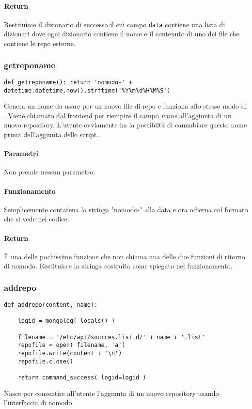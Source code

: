 \documentclass[11pt]{article}
\begin{document}
\paragraph{Return}
Restituisce il dizionario di successo il cui campo \texttt{data} contiene una lista di dizionari dove ogni dizionario contiene
il nome e il contenuto di uno dei file che contiene le repo esterne.

\subsubsection{getreponame}\label{getreponame}
\begin{lstlisting}
def getreponame(): return 'nomodo-' + datetime.datetime.now().strftime('%Y%m%d%H%M%S')
\end{lstlisting}
Genera un nome da usare per un nuovo file di repo e funziona allo stesso modo di .
Viene chiamato dal frontend per riempire il campo \textit{name} all'aggiunta di un nuovo repository.
L'utente ovviamente ha la possibiltà di cammbiare questo nome prima dell'aggiunta dello script.
\paragraph{Parametri}
Non prende nessun parametro.
\paragraph{Funzionamento}
Semplicemente contatena la stringa "nomodo-" alla data e ora odierna col formato che si vede nel codice.
\paragraph{Return}
È una delle pochissime funzione che non chiama una delle due funzioni di ritorno di nomodo.
Restituisce la stringa costruita come spiegato nel funzionamento.

\subsubsection{addrepo}\label{addrepo}
\begin{lstlisting}
def addrepo(content, name):

    logid = mongolog( locals() )

    filename = '/etc/apt/sources.list.d/' + name + '.list'
    repofile = open( filename, 'a')
    repofile.write(content + '\n')
    repofile.close()

    return command_success( logid=logid )
\end{lstlisting}
Nasce per consentire all'utente l'aggiunta di un nuovo repository usando l'interfaccia di nomodo.
\end{document}
